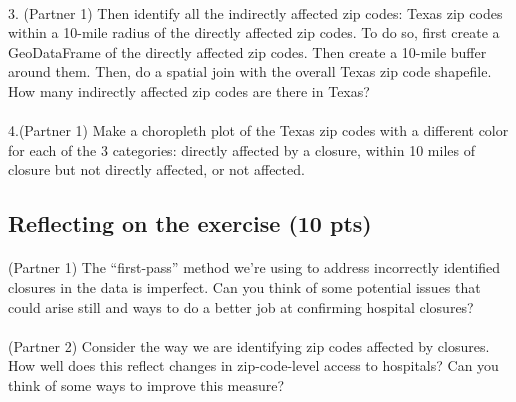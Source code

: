 \documentclass[
  letterpaper,
  DIV=11,
  numbers=noendperiod]{scrartcl}
\makeatletter
\let\oldparagraph\paragraph
\renewcommand{\paragraph}{
    \@ifstar
      \xxxParagraphStar
      \xxxParagraphNoStar
  }
\newcommand{\xxxParagraphStar}[1]{\oldparagraph*{#1}\mbox{}}
\newcommand{\xxxParagraphNoStar}[1]{\oldparagraph{#1}\mbox{}}
\makeatother
\begin{document}
\paragraph{3. (Partner 1) Then identify all the indirectly affected zip
codes: Texas zip codes within a 10-mile radius of the directly affected
zip codes. To do so, first create a GeoDataFrame of the directly
affected zip codes. Then create a 10-mile buffer around them. Then, do a
spatial join with the overall Texas zip code shapefile. How many
indirectly affected zip codes are there in
Texas?}\label{partner-1-then-identify-all-the-indirectly-affected-zip-codes-texas-zip-codes-within-a-10-mile-radius-of-the-directly-affected-zip-codes.-to-do-so-first-create-a-geodataframe-of-the-directly-affected-zip-codes.-then-create-a-10-mile-buffer-around-them.-then-do-a-spatial-join-with-the-overall-texas-zip-code-shapefile.-how-many-indirectly-affected-zip-codes-are-there-in-texas}

\paragraph{4.(Partner 1) Make a choropleth plot of the Texas zip codes
with a different color for each of the 3 categories: directly affected
by a closure, within 10 miles of closure but not directly affected, or
not
affected.}\label{partner-1-make-a-choropleth-plot-of-the-texas-zip-codes-with-a-different-color-for-each-of-the-3-categories-directly-affected-by-a-closure-within-10-miles-of-closure-but-not-directly-affected-or-not-affected.}

\subsection{Reflecting on the exercise (10
pts)}\label{reflecting-on-the-exercise-10-pts}

\paragraph{(Partner 1) The ``first-pass'' method we're using to address
incorrectly identified closures in the data is imperfect. Can you think
of some potential issues that could arise still and ways to do a better
job at confirming hospital
closures?}\label{partner-1-the-first-pass-method-were-using-to-address-incorrectly-identified-closures-in-the-data-is-imperfect.-can-you-think-of-some-potential-issues-that-could-arise-still-and-ways-to-do-a-better-job-at-confirming-hospital-closures}

\paragraph{(Partner 2) Consider the way we are identifying zip codes
affected by closures. How well does this reflect changes in
zip-code-level access to hospitals? Can you think of some ways to
improve this
measure?}\label{partner-2-consider-the-way-we-are-identifying-zip-codes-affected-by-closures.-how-well-does-this-reflect-changes-in-zip-code-level-access-to-hospitals-can-you-think-of-some-ways-to-improve-this-measure}
\end{document}

